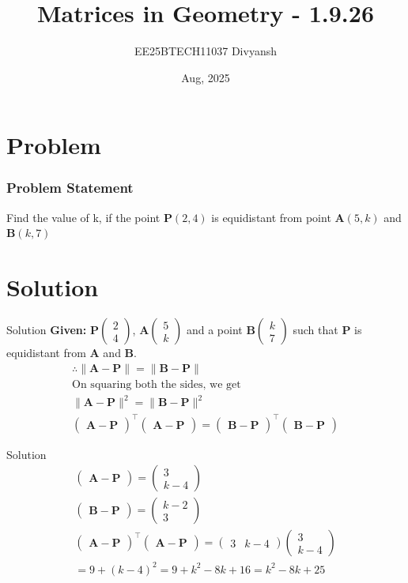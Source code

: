 \documentclass{beamer}
\title{Matrices in Geometry - 1.9.26}
\author{EE25BTECH11037  Divyansh}
\date{Aug, 2025}
\let\vec\mathbf
\providecommand{\brak}[1]{\ensuremath{\left(#1\right)}}
\theoremstyle{remark}
\providecommand{\norm}[1]{\lVert#1\rVert}
\newcommand{\myvec}[1]{\ensuremath{\begin{pmatrix}#1\end{pmatrix}}}
\begin{document}
\maketitle




\section{Problem}
\begin{frame}
\frametitle{Problem Statement}
Find the value of k, if the point $\vec{P}\brak{2,4}$ is equidistant from point $\vec{A}\brak{5,k}$ and $\vec{B}\brak{k,7}$
\end{frame}

\section{Solution}
\begin{frame}{Solution}
   \textbf{Given: } 
$\vec{P}\myvec{2\\4}$, $\vec{A}\myvec{5\\k}$ and a point $\vec{B} \myvec{k \\ 7}$ such that $\vec{P}$ is equidistant from $\vec{A}$ and $\vec{B}$. 
\begin{align}
    \therefore \norm{\vec{A}-\vec{P}}=\norm{\vec{B}-\vec{P}}\\
    \text{On squaring both the sides, we get }\\
    \norm{\vec{A}-\vec{P}}^2=\norm{\vec{B}-\vec{P}}^2\\
    \myvec{\vec{A}-\vec{P}}^{\top}\myvec{\vec{A}-\vec{P}}=\myvec{\vec{B}-\vec{P}}^{\top}\myvec{\vec{B}-\vec{P}}
\end{align}
\end{frame}

\begin{frame}{Solution}
\begin{align}
    \myvec{\vec{A}-\vec{P}}=\myvec{3 \\ k-4}\\
    \myvec{\vec{B}-\vec{P}}=\myvec{k-2 \\ 3}\\
    \myvec{\vec{A}-\vec{P}}^{\top}\myvec{\vec{A}-\vec{P}}=\myvec{3 & k-4}\myvec{3 \\ k-4}\\=9+\brak{k-4}^2=9 + k^2 - 8k +16  =k^2 - 8k + 25
\end{align}
\end{frame}
\end{document}
